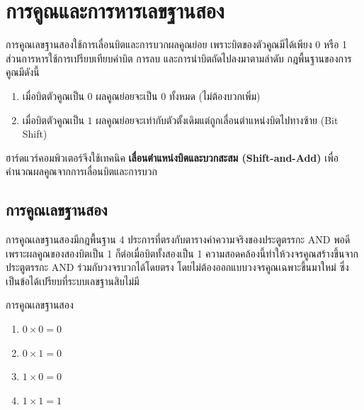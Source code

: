 \section{การคูณและการหารเลขฐานสอง}
\label{sec:binary-mult-div}

การคูณเลขฐานสองใช้การเลื่อนบิตและการบวกผลคูณย่อย เพราะบิตของตัวคูณมีได้เพียง 0 หรือ 1 ส่วนการหารใช้การเปรียบเทียบค่าบิต การลบ และการนำบิตถัดไปลงมาตามลำดับ กฎพื้นฐานของการคูณมีดังนี้~\parencite{wakerly2018digital}
\begin{enumerate}[label=\textbf{\arabic*.}]
    \item เมื่อบิตตัวคูณเป็น $0$ ผลคูณย่อยจะเป็น $0$ ทั้งหมด (ไม่ต้องบวกเพิ่ม)
    \item เมื่อบิตตัวคูณเป็น $1$ ผลคูณย่อยจะเท่ากับตัวตั้งเดิมแต่ถูกเลื่อนตำแหน่งบิตไปทางซ้าย (Bit Shift)
\end{enumerate}
ฮาร์ดแวร์คอมพิวเตอร์จึงใช้เทคนิค \textbf{เลื่อนตำแหน่งบิตและบวกสะสม (Shift-and-Add)} เพื่อคำนวณผลคูณจากการเลื่อนบิตและการบวก

\subsection{การคูณเลขฐานสอง}
การคูณเลขฐานสองมีกฎพื้นฐาน 4 ประการที่ตรงกับตารางค่าความจริงของประตูตรรกะ AND พอดี เพราะผลคูณของสองบิตเป็น 1 ก็ต่อเมื่อบิตทั้งสองเป็น 1 ความสอดคล้องนี้ทำให้วงจรคูณสร้างขึ้นจากประตูตรรกะ AND ร่วมกับวงจรบวกได้โดยตรง โดยไม่ต้องออกแบบวงจรคูณเฉพาะขึ้นมาใหม่ ซึ่งเป็นข้อได้เปรียบที่ระบบเลขฐานสิบไม่มี~\parencite{tremblay1975structures}

\begin{law}
\label{law:binary-multiplication-rules}
การคูณเลขฐานสอง
\begin{enumerate}
    \item $0 \times 0 = 0$
    \item $0 \times 1 = 0$
    \item $1 \times 0 = 0$
    \item $1 \times 1 = 1$
\end{enumerate}
\end{law}

